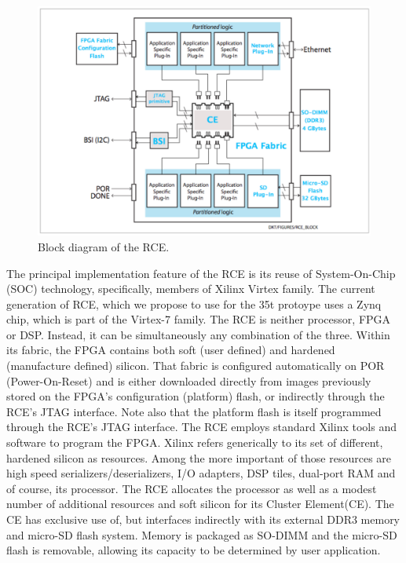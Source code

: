 \begin{figure}[tbh]
\includegraphics[scale=0.8]{rce-block.pdf}
\caption{Block diagram of the RCE.}
\label{fig:RCEblock}
\end{figure} 

The principal implementation feature of the RCE is its reuse 
of System-On-Chip (SOC) technology, specifically, members of 
Xilinx Virtex family.
The current generation of RCE, which we propose to use
for the 35t protoype uses a Zynq chip, which is part of the Virtex-7 family. 
The RCE is neither processor, FPGA or DSP. 
Instead, it can be simultaneously any combination of the three. 
Within its fabric, the FPGA contains both soft (user defined) 
and hardened (manufacture defined) silicon. 
That fabric is configured automatically on POR (Power-On-Reset) 
and is either downloaded directly from images previously stored on the 
FPGA's configuration (platform) flash, or indirectly through the RCE's JTAG interface.
Note also that the platform flash is itself programmed through the RCE's 
JTAG interface. 
The RCE employs standard Xilinx tools and software to program the FPGA.
Xilinx refers generically to its set of different, hardened silicon as resources. 
Among the more important of those resources are high speed serializers/deserializers,
 I/O adapters, DSP tiles, dual-port RAM and of course, its processor. 
The RCE allocates the processor as well as a modest number of additional
 resources and soft silicon for its Cluster Element(CE). 
The CE has exclusive use of, but interfaces indirectly with its external
DDR3 memory and micro-SD flash system. 
Memory is packaged as SO-DIMM and the micro-SD flash is removable, 
allowing its capacity to be determined by user application.

